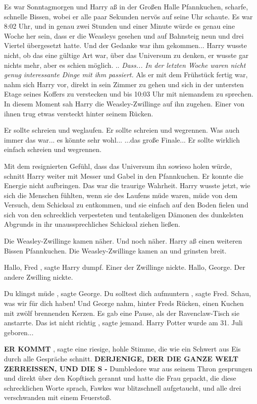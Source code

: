 Es war Sonntagmorgen und Harry aß in der Großen Halle Pfannkuchen, scharfe,
schnelle Bissen, wobei er alle paar Sekunden nervös auf seine Uhr schaute. Es
war 8:02 Uhr, und in genau zwei Stunden und einer Minute würde es genau eine
Woche her sein, dass er die Weasleys gesehen und auf Bahnsteig neun und drei
Viertel übergesetzt hatte. Und der Gedanke war ihm gekommen... Harry wusste
nicht, ob das eine gültige Art war, über das Universum zu denken, er wusste gar
nichts mehr, aber es schien möglich. ..\emph{ Dass... In der letzten Woche waren
nicht genug interessante Dinge mit ihm passiert.} Als er mit dem Frühstück
fertig war, nahm sich Harry vor, direkt in sein Zimmer zu gehen und sich in der
untersten Etage seines Koffers zu verstecken und bis 10:03 Uhr mit niemandem zu
sprechen. In diesem Moment sah Harry die Weasley-Zwillinge auf ihn zugehen.
Einer von ihnen trug etwas versteckt hinter seinem Rücken.

Er sollte schreien und weglaufen. Er sollte schreien und wegrennen. Was auch
immer das war... es könnte sehr wohl... ...das große Finale... Er sollte
wirklich einfach schreien und wegrennen.

Mit dem resignierten Gefühl, dass das Universum ihn sowieso holen würde, schnitt
Harry weiter mit Messer und Gabel in den Pfannkuchen. Er konnte die Energie
nicht aufbringen. Das war die traurige Wahrheit. Harry wusste jetzt, wie sich
die Menschen fühlten, wenn sie des Laufens müde waren, müde von dem Versuch, dem
Schicksal zu entkommen, und sie einfach auf den Boden fielen und sich von den
schrecklich verpesteten und tentakeligen Dämonen des dunkelsten Abgrunds in ihr
unaussprechliches Schicksal ziehen ließen.

Die Weasley-Zwillinge kamen näher. Und noch näher. Harry aß einen weiteren
Bissen Pfannkuchen. Die Weasley-Zwillinge kamen an und grinsten breit.

\glqq Hallo, Fred\grqq{} , sagte Harry dumpf. Einer der Zwillinge nickte. \glqq
Hallo, George.\grqq{} Der andere Zwilling nickte.

\glqq Du klingst müde\grqq{} , sagte George. \glqq Du solltest dich
aufmuntern\grqq{} , sagte Fred. \glqq Schau, was wir für dich haben!\grqq{} Und
George nahm, hinter Freds Rücken, einen Kuchen mit zwölf brennenden Kerzen. Es
gab eine Pause, als der Ravenclaw-Tisch sie anstarrte. \glqq Das ist nicht
richtig\grqq{} , sagte jemand. \glqq Harry Potter wurde am 31. Juli
geboren...\grqq{}

\textbf{\glqq ER KOMMT\grqq{} }, sagte eine riesige, hohle Stimme, die wie ein
Schwert aus Eis durch alle Gespräche schnitt. \textbf{ \glqq DERJENIGE, DER DIE
GANZE WELT ZERREISSEN, UND DIE S -\grqq{} } Dumbledore war aus seinem Thron
gesprungen und direkt über den Kopftisch gerannt und hatte die Frau gepackt, die
diese schrecklichen Worte sprach, Fawkes war blitzschnell aufgetaucht, und alle
drei verschwanden mit einem Feuerstoß.

